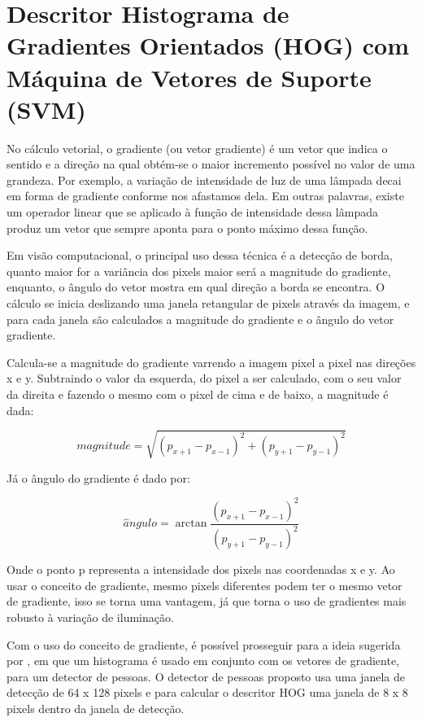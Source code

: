 \section{Descritor Histograma de Gradientes Orientados (HOG) com Máquina de Vetores de Suporte (SVM)}


No cálculo vetorial, o gradiente (ou vetor gradiente) é um vetor que indica o sentido e a direção na qual obtém-se o maior incremento possível no valor de uma grandeza. Por exemplo, a variação de intensidade de luz de uma lâmpada decai em forma de gradiente conforme nos afastamos dela. Em outras palavras, existe um operador linear que se aplicado à função de intensidade dessa lâmpada produz um vetor que sempre aponta para o ponto máximo dessa função.

Em visão computacional, o principal uso dessa técnica é a detecção de borda, quanto maior for a variância dos pixels maior será a magnitude do gradiente, enquanto, o ângulo do vetor mostra em qual direção a borda se encontra. O cálculo se inicia deslizando uma janela retangular de pixels através da imagem, e para cada janela são calculados a magnitude do gradiente e o ângulo do vetor gradiente.

Calcula-se a magnitude do gradiente varrendo a imagem pixel a pixel nas direções x e y. Subtraindo o valor da esquerda, do pixel a ser calculado, com o seu valor da direita e fazendo o mesmo com o pixel de cima e de baixo, a magnitude é dada: 

\begin{equation}
 magnitude = \sqrt{(p_{x+1} - p_{x-1})^2 + (p_{y+1} - p_{y-1})^2} 
\end{equation}

Já o ângulo do gradiente é dado por:

\begin{equation}
 \hat{a}ngulo = \arctan{ \frac {(p_{x+1} - p_{x-1})^2}  {(p_{y+1} - p_{y-1})^2}} 
\end{equation}

Onde o ponto p representa a intensidade dos pixels nas coordenadas x e y. Ao usar o conceito de gradiente, mesmo pixels diferentes podem ter o mesmo vetor de gradiente, isso se torna uma vantagem, já que torna o uso de gradientes mais robusto à variação de iluminação.

Com o uso do conceito de gradiente, é possível prosseguir para a ideia sugerida por , em que um histograma é usado em conjunto com os vetores de gradiente, para um detector de pessoas. O detector de pessoas proposto usa uma janela de detecção de 64 x 128 pixels e para calcular o descritor HOG uma janela de 8 x 8 pixels dentro da janela de detecção.

